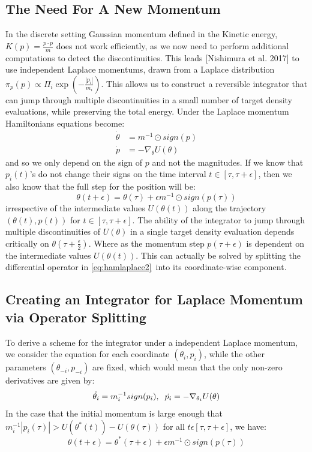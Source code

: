 \documentclass[]{report}
\begin{document}
\subsection{The Need For A New Momentum}
In the discrete setting Gaussian momentum defined in the Kinetic energy, $K(p) = \frac{p\cdot p}{m}$ does not work efficiently, as we now need to perform additional computations to detect the discontinuities. This leads [Nishimura et al. 2017] to use independent Laplace momentums, drawn from a Laplace distribution $\pi_{p}(p) \propto \Pi_{i} \exp(-\frac{|p_{i}|}{m_{i}})$. This allows us to construct a reversible integrator that can jump through multiple discontinuities in a small number of target density evaluations, while preserving the total energy. 
Under the Laplace momentum Hamiltonians equations become: \begin{align}
\label{eq:hamlaplace1}
\dot{\theta} &= m^{-1} \odot sign(p)\\
\label{eq:hamlaplace2}
\dot{p} &= -\nabla_{\theta} U(\theta)
\end{align}
and so we only depend on the sign of $p$ and not the magnitudes. If we know that $p_{i}(t)$'s do not change their signs on the time interval $t \in [\tau, \tau + \epsilon]$, then we also know that the full step for the position will be:\begin{equation}
\theta(t + \epsilon) = \theta(\tau) + \epsilon m^{-1} \odot sign(p(\tau))
\end{equation} irrespective of the intermediate values $U(\theta(t))$ along the trajectory $(\theta(t),p(t))$ for $t \in [\tau, \tau + \epsilon]$. The ability of the integrator to jump through multiple discontinuities of $U(\theta)$ in a single target density evaluation depends critically on $\theta(\tau + \frac{\epsilon}{2})$. Where as the momentum step $p(\tau + \epsilon)$ is dependent on the intermediate values $U(\theta(t))$. This can actually be solved by splitting the differential operator in \ref{eq:hamlaplace2}\, into its coordinate-wise component. 
\subsection{Creating an Integrator for Laplace Momentum via Operator Splitting}

To derive a scheme for the integrator under a independent Laplace momentum, we consider the equation for each coordinate $(\theta_{i}, p_{i})$, while the other parameters $(\theta_{-i},p_{-i})$ are fixed, which would mean that the only non-zero derivatives are given by:\begin{equation}
	\dot{\theta_{i}} = m^{-1}_{i} sign(p_{i}), \hspace{2mm} \dot{p_{i}} = -\nabla_{\theta_{i}} U(\theta) 
\end{equation}
In the case that the initial momentum is large enough that $m^{-1}_{i}|p_{i}(\tau)| > U(\theta^{*}(t)) - U(\theta(\tau))$ for all $t \epsilon [\tau, \tau + \epsilon]$, we have: \begin{equation}
	\theta(t + \epsilon) = \theta^{*}(\tau + \epsilon) + \epsilon m^{-1} \odot sign(p(\tau))
\end{equation}
\end{document}
